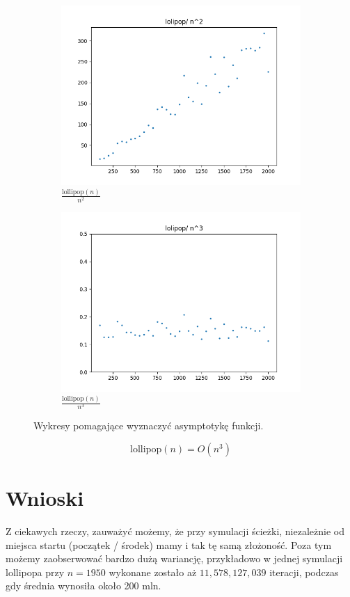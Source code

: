 \documentclass{article}
\begin{document}
\begin{figure}[H]
\begin{subfigure}{.475\textwidth}
    \includegraphics[width=\textwidth]{lollipop_nn.png}
    \caption{\( \frac{\text{lollipop}(n)}{n^2} \)}
    \label{fig:lollipop_nn}
  \end{subfigure}%
  \begin{subfigure}{.475\textwidth}
    \centering
    \includegraphics[width=\textwidth]{lollipop_nnn.png}
    \caption{\( \frac{\text{lollipop}(n)}{n^3} \)}
    \label{fig:lollipop_nnn}
  \end{subfigure}%
  \caption{Wykresy pomagające wyznaczyć asymptotykę funkcji.}
  \label{fig:bn}
\end{figure}
\[\text{lollipop}(n)=O(n^3)\]

\justifying
\section{Wnioski}
Z ciekawych rzeczy, zauważyć możemy, że przy symulacji ścieżki, niezależnie
od miejsca startu (początek / środek) mamy i tak tę samą złożoność. Poza tym
możemy zaobserwować bardzo dużą wariancję, przykładowo w jednej symulacji lollipopa
przy \(n = 1950\) wykonane zostało aż \(11,578,127,039\) iteracji, podczas gdy
średnia wynosiła około 200 mln.
\end{document}
